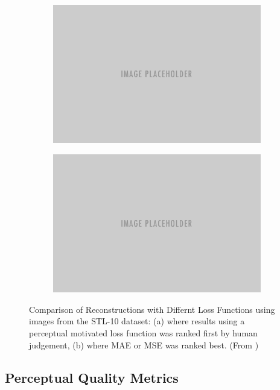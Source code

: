 \begin{figure}[htpb]
\centering
\begin{subfigure}{0.5\textwidth}
  \centering
  \includegraphics[width=.8\linewidth]{figures/placeholder.png}
  \caption{}
  \label{fig:percept-vs-lp1}
\end{subfigure}%
\begin{subfigure}{0.5\textwidth}
  \centering
  \includegraphics[width=.8\linewidth]{figures/placeholder.png}
  \caption{}
  \label{fig:percept-vs-lp1}
\end{subfigure}
\caption[Comparison of Reconstructions with Differnt Loss Functions]{Comparison of Reconstructions with Differnt Loss Functions using images from the STL-10 dataset: (a) where results using a perceptual motivated loss function was ranked first by human judgement, (b) where MAE or MSE was ranked best. (From \parencite{learning-perc-sim})}
\label{fig:percept-vs-lp}
\end{figure}


\subsection{Perceptual Quality Metrics}

